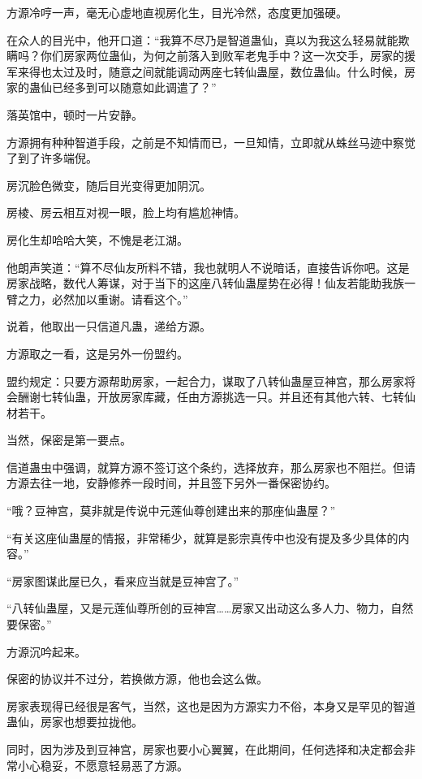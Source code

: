 
\begin{this_body}

方源冷哼一声，毫无心虚地直视房化生，目光冷然，态度更加强硬。

在众人的目光中，他开口道：“我算不尽乃是智道蛊仙，真以为我这么轻易就能欺瞒吗？你们房家两位蛊仙，为何之前落入到败军老鬼手中？这一次交手，房家的援军来得也太过及时，随意之间就能调动两座七转仙蛊屋，数位蛊仙。什么时候，房家的蛊仙已经多到可以随意如此调遣了？”

落英馆中，顿时一片安静。

方源拥有种种智道手段，之前是不知情而已，一旦知情，立即就从蛛丝马迹中察觉了到了许多端倪。

房沉脸色微变，随后目光变得更加阴沉。

房棱、房云相互对视一眼，脸上均有尴尬神情。

房化生却哈哈大笑，不愧是老江湖。

他朗声笑道：“算不尽仙友所料不错，我也就明人不说暗话，直接告诉你吧。这是房家战略，数代人筹谋，对于当下的这座八转仙蛊屋势在必得！仙友若能助我族一臂之力，必然加以重谢。请看这个。”

说着，他取出一只信道凡蛊，递给方源。

方源取之一看，这是另外一份盟约。

盟约规定：只要方源帮助房家，一起合力，谋取了八转仙蛊屋豆神宫，那么房家将会酬谢七转仙蛊，开放房家库藏，任由方源挑选一只。并且还有其他六转、七转仙材若干。

当然，保密是第一要点。

信道蛊虫中强调，就算方源不签订这个条约，选择放弃，那么房家也不阻拦。但请方源去往一地，安静修养一段时间，并且签下另外一番保密协约。

“哦？豆神宫，莫非就是传说中元莲仙尊创建出来的那座仙蛊屋？”

“有关这座仙蛊屋的情报，非常稀少，就算是影宗真传中也没有提及多少具体的内容。”

“房家图谋此屋已久，看来应当就是豆神宫了。”

“八转仙蛊屋，又是元莲仙尊所创的豆神宫……房家又出动这么多人力、物力，自然要保密。”

方源沉吟起来。

保密的协议并不过分，若换做方源，他也会这么做。

房家表现得已经很是客气，当然，这也是因为方源实力不俗，本身又是罕见的智道蛊仙，房家也想要拉拢他。

同时，因为涉及到豆神宫，房家也要小心翼翼，在此期间，任何选择和决定都会非常小心稳妥，不愿意轻易恶了方源。


\end{this_body}
